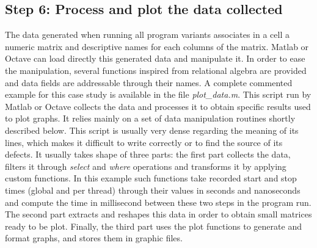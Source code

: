 \subsection{Step 6: Process and plot the data collected}
\label{sec:format}
The data generated when running all program variants associates in a cell a numeric matrix and descriptive names for each columns of the matrix. Matlab or Octave can load directly this generated data and manipulate it. In order to ease the manipulation, several functions inspired from relational algebra are provided and data fields are addressable through their names. A complete commented example for this case study is available in the file \emph{plot\_data.m}. This script run by Matlab or Octave collects the data and processes it to obtain specific results used to plot graphs. It relies mainly on a set of data manipulation routines shortly described below. This script is usually very dense regarding the meaning of its lines, which makes it difficult to write correctly or to find the source of its defects. It usually takes shape of three parts: the first part collects the data, filters it through \emph{select} and \emph{where} operations and transforms it by applying custom functions. In this example such functions take recorded start and stop times (global and per thread) through their values in seconds and nanoseconds and compute the time in millisecond between these two steps in the program run. The second part extracts and reshapes this data in order to obtain small matrices ready to be plot. Finally, the third part uses the plot functions to generate and format graphs, and stores them in graphic files.

